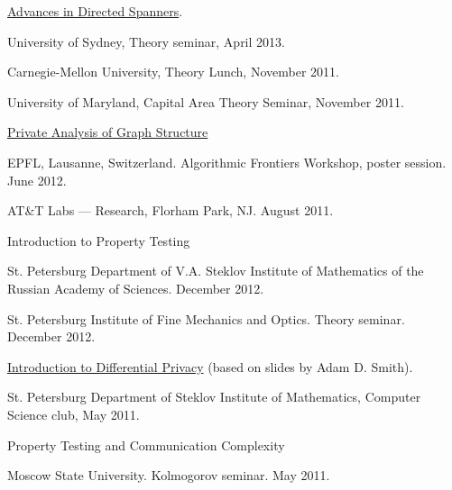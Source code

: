 \documentclass[11pt]{article}
\newenvironment{innerlist}[1][\enskip\textbullet]%
        {\begin{compactitem}[#1]}{\end{compactitem}}
\begin{document}
\begin{innerlist}
\item \href{http://grigory.us/files/talks/AdvancesInDirectedSpanners.pdf}{Advances in Directed Spanners}.
\begin{innerlist}
\item University of Sydney, Theory seminar, April 2013.
\item Carnegie-Mellon University, Theory Lunch, November 2011.
\item University of Maryland, Capital Area Theory Seminar, November 2011.
\end{innerlist}

\item \href{http://grigory.us/files/talks/KRSY-VLDB11.pptx}{Private Analysis of Graph Structure}
\begin{innerlist}
  \item EPFL, Lausanne, Switzerland. Algorithmic Frontiers Workshop, poster session. June 2012.
  \item AT\&T Labs --- Research, Florham Park, NJ. August 2011.
\end{innerlist}

\item Introduction to Property Testing
\begin{innerlist}
\item St. Petersburg Department of V.A. Steklov Institute of Mathematics of the Russian Academy of Sciences. December 2012.
\item St. Petersburg Institute of Fine Mechanics and Optics. Theory seminar. December 2012.
\end{innerlist}

\item \href{http://grigory.us/talsk/DPIntro.pptx}{Introduction to Differential Privacy} (based on slides by Adam D. Smith).
\begin{innerlist}
\item St. Petersburg Department of Steklov Institute of Mathematics, Computer Science club, May 2011.
\end{innerlist}

\item Property Testing and Communication Complexity
\begin{innerlist}
\item Moscow State University. Kolmogorov seminar. May 2011.
\end{innerlist}



\end{innerlist}
\end{document}
